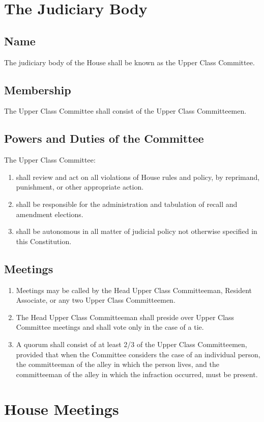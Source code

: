 \documentclass[10pt]{article} %
\begin{document}
\section{The Judiciary Body}
\subsection{Name}
The judiciary body of the House shall be known as the Upper Class Committee.
\subsection{Membership}
The Upper Class Committee shall consist of the Upper Class Committeemen.
\subsection{Powers and Duties of the Committee}
The Upper Class Committee:
\begin{enumerate}
\item shall review and act on all violations of House rules and policy, by reprimand, punishment, or other appropriate action.
\item shall be responsible for the administration and tabulation of recall and amendment elections.
\item shall be autonomous in all matter of judicial policy not otherwise specified in this Constitution.
\end{enumerate}
\subsection{Meetings}
\begin{enumerate}
\item Meetings may be called by the Head Upper Class Committeeman, Resident Associate, or any two Upper Class Committeemen.
\item The Head Upper Class Committeeman shall preside over Upper Class Committee meetings and shall vote only in the case of a tie.
\item A quorum shall consist of at least 2/3 of the Upper Class Committeemen, provided that when the Committee considers the case of an individual person, the committeeman of the alley in which the person lives, and the committeeman of the alley in which the infraction occurred, must be present.
\end{enumerate}
\section{House Meetings}
\end{document}
